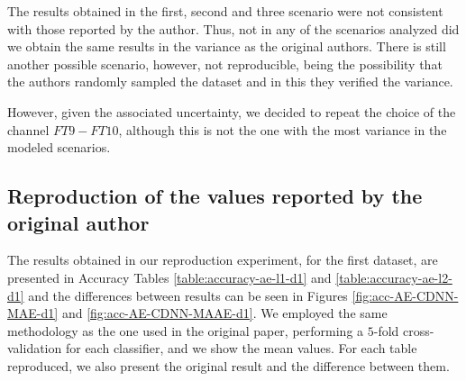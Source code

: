 The results obtained in the first, second and three scenario were not consistent with those reported by the author. Thus, not in any of the scenarios analyzed did we obtain the same results in the variance as the original authors. There is still another possible scenario, however, not reproducible, being the possibility that the authors randomly sampled the dataset and in this they verified the variance. 

However, given the associated uncertainty, we decided to repeat the choice of the channel $FT9-FT10$, although this is not the one with the most variance in the modeled scenarios.


\subsection{Reproduction of the values reported by the original author}

The results obtained in our reproduction experiment, for the first dataset, are presented in Accuracy Tables \ref{table:accuracy-ae-l1-d1} and \ref{table:accuracy-ae-l2-d1} and the differences between results can be seen in Figures \ref{fig:acc-AE-CDNN-MAE-d1} and \ref{fig:acc-AE-CDNN-MAAE-d1}. We employed the same methodology as the one used in the original paper, performing a $5$-fold cross-validation for each classifier, and we show the mean values. For each table reproduced, we also present the original result and the difference between them.

